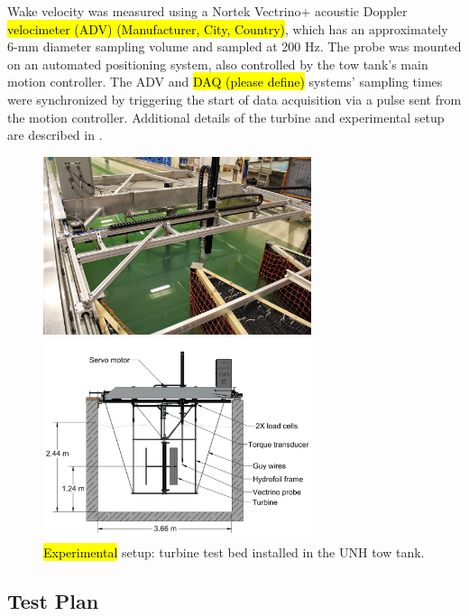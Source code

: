 \documentclass[energies,article,accept,moreauthors,pdftex,10pt,a4paper]{mdpi}
\theoremstyle{mdpi}
\newcounter{ex}
\newcounter{re}
\begin{document}
Wake velocity was measured using a Nortek Vectrino+ acoustic Doppler \hl {velocimeter
(ADV)  (Manufacturer, City, Country)}, which has an approximately 6-mm diameter sampling volume and sampled at
200 Hz. The probe was mounted on an automated positioning system, also
controlled by the tow tank's main motion controller. The ADV and \hl {DAQ (please define)} systems'
sampling times were synchronized by triggering the start of data acquisition via
a pulse sent from the motion controller. Additional details of the turbine and
experimental setup are described in \cite{Bachant2015-JoT}.

\begin{figure}[H]
 \centering

 \includegraphics[width=0.7\textwidth]{figures/exp-setup-photo}
 
 \includegraphics[width=0.7\textwidth]{figures/exp_setup_drawing}
 
 \caption{\hl {Experimental} setup: turbine test bed installed in the UNH tow tank.}
 
 \label{fig:exp-setup}
\end{figure}


\subsection{Test Plan}
\end{document}
